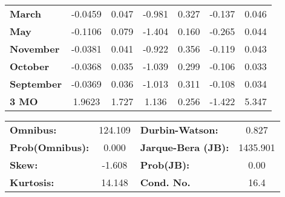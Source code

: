 \begin{center}
\begin{tabular}{lcccccc}
\textbf{March}     &      -0.0459  &        0.047     &    -0.981  &         0.327        &       -0.137    &        0.046     \\
\textbf{May}       &      -0.1106  &        0.079     &    -1.404  &         0.160        &       -0.265    &        0.044     \\
\textbf{November}  &      -0.0381  &        0.041     &    -0.922  &         0.356        &       -0.119    &        0.043     \\
\textbf{October}   &      -0.0368  &        0.035     &    -1.039  &         0.299        &       -0.106    &        0.033     \\
\textbf{September} &      -0.0369  &        0.036     &    -1.013  &         0.311        &       -0.108    &        0.034     \\
\textbf{3 MO}      &       1.9623  &        1.727     &     1.136  &         0.256        &       -1.422    &        5.347     \\
\bottomrule
\end{tabular}
\begin{tabular}{lclc}
\textbf{Omnibus:}       & 124.109 & \textbf{  Durbin-Watson:     } &    0.827  \\
\textbf{Prob(Omnibus):} &   0.000 & \textbf{  Jarque-Bera (JB):  } & 1435.901  \\
\textbf{Skew:}          &  -1.608 & \textbf{  Prob(JB):          } &     0.00  \\
\textbf{Kurtosis:}      &  14.148 & \textbf{  Cond. No.          } &     16.4  \\
\bottomrule
\end{tabular}
\end{center}


